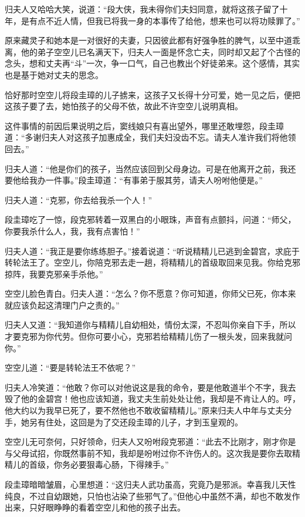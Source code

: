 \documentclass[12pt,oneside]{book}
\begin{document}
归夫人又哈哈大笑，说道：``段大侠，我未得你们夫妇同意，就将这孩子留了十年，是有点不近人情，但我已将我一身的本事传了给他，想来也可以将功赎罪了。''

原来藏灵子和她本是一对很好的夫妻，只因彼此都有好强争胜的脾气，以至中道乖离，他的弟子空空儿已名满天下，归夫人一面是怀念亡夫，同时却又起了个古怪的念头，想和丈夫再``斗''一次，争一口气，自己也教出个好徒弟来。这个感情，其实也是基于她对丈夫的思念。

恰好那时空空儿将段圭璋的儿子掳来，这孩子又长得十分可爱，她一见之后，便把这孩子要了去，她怕孩子的父母不依，故此不许空空儿说明真相。

这件事情的前因后果说明之后，窦线娘只有喜出望外，哪里还敢埋怨，段圭璋道：``多谢归夫人对这孩子加惠成全，我们夫妇没齿不忘。请夫人准许我们将他领回去。''

归夫人道：``他是你们的孩子，当然应该回到父母身边。可是在他离开之前，我还要他给我办一件事。''段圭璋道：``有事弟于服其劳，请夫人吩咐他便是。''

归夫人道：``克邪，你去给我杀一个人！''

段圭璋吃了一惊，段克邪转着一双黑白的小眼珠，声音有点颤抖，问道：``师父，你要我杀什么人，我，我有点害怕！''

归夫人道：``我正是要你练练胆子。''接着说道：``听说精精儿已逃到金碧宫，求庇于转轮法王了。空空儿，你陪克邪去走一趟，将精精儿的首级取回来见我。你给克邪掠阵，我要克邪亲手杀他。''

空空儿脸色青白。归夫人道：``怎么？你不愿意？你可知道，你师父已死，你本来就应该负起这清理门户之责的。''

归夫人又道：``我知道你与精精儿自幼相处，情份太深，不忍叫你亲自下手，所以才要克邪为你代劳。但你可要小心，克邪若给精精儿伤了一根头发，回来我就问你。''

空空儿道：``要是转轮法王不依呢？''

归夫人冷笑道：``他敢？你可以对他说这是我的命令，要是他敢道半个不字，我去毁了他的金碧宫！他也应该知道，我丈夫生前处处让他，我却是不肯让人的。哼，他大约以为我早已死了，要不然他也不敢收留精精儿。''原来归夫人中年与丈夫分手，她另有住处，这回是为了交还段圭璋的儿子，才到玉皇观的。

空空儿无可奈何，只好领命，归夫人又吩咐段克邪道：``此去不比刚才，刚才你是与父母试招，你既然事前不知，我却是吩咐过你不许伤人的。这次我是要你去取精精儿的首级，你务必要狠毒心肠，下得辣手。''

段圭璋暗暗皱眉，心里想道：``这归夫人武功虽高，究竟乃是邪派。幸喜我儿天性纯良，不过自幼跟她，只怕也沾染了些邪气了。''但他心中虽然不满，却也不敢发作出来，只好眼睁睁的看着空空儿和他的孩子出去。
\end{document}
